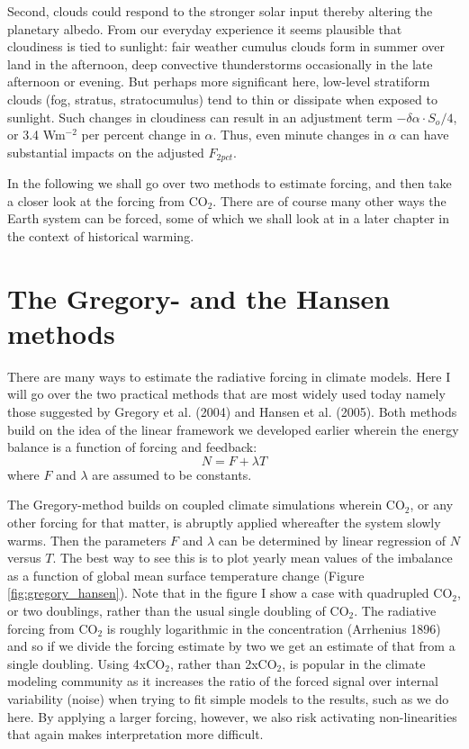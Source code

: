 \documentclass[12pt]{book}
\begin{document}
Second, clouds could respond to the stronger solar input thereby altering the planetary albedo. From our everyday experience it seems plausible that cloudiness is tied to sunlight: fair weather cumulus clouds form in summer over land in the afternoon, deep convective thunderstorms occasionally in the late afternoon or evening. But perhaps more significant here, low-level stratiform clouds (fog, stratus, stratocumulus) tend to thin or dissipate when exposed to sunlight. 
Such  changes in cloudiness can result in an adjustment term $-\delta \alpha \cdot S_o/4$, or 3.4 Wm$^{-2}$ per percent change in $\alpha$. Thus, even minute changes in $\alpha$ can have substantial impacts on the adjusted $F_{2pct}$.

\vspace{0.5 cm}
\noindent
In the following we shall go over two methods to estimate forcing, and then take a closer look at the forcing from CO$_2$. There are of course many other ways the Earth system can be forced, some of which we shall look at in a later chapter in the context of historical warming. 

\section{The Gregory- and the Hansen methods}
\label{sec:gregory-hansen}
There are many ways to estimate the radiative forcing in climate models. Here I will go over the two practical methods that are most widely used today namely those suggested by Gregory et al. (2004) and Hansen et al. (2005). Both methods build on the idea of the linear framework we developed earlier wherein the energy balance is a function of forcing and feedback:
$$N=F+\lambda T$$
where $F$ and $\lambda$ are assumed to be constants. 

The Gregory-method builds on coupled climate simulations wherein CO$_2$, or any other forcing for that matter, is abruptly applied whereafter the system slowly warms. Then the parameters $F$ and $\lambda$ can be determined by linear regression of $N$ versus $T$. The best way to see this is to plot yearly mean values of the imbalance as a function of global mean surface temperature change (Figure \ref{fig:gregory_hansen}). Note that in the figure I show a case with quadrupled CO$_2$, or two doublings, rather than the usual single doubling of CO$_2$. The radiative forcing from CO$_2$ is roughly logarithmic in the concentration (Arrhenius 1896) and so if we divide the forcing estimate by two we get an estimate of that from a single doubling. Using 4xCO$_2$, rather than 2xCO$_2$, is popular in the climate modeling community as it increases the ratio of the forced signal over internal variability (noise) when trying to fit simple models to the results, such as we do here. By applying a larger forcing, however, we also risk activating non-linearities that again makes interpretation more difficult.
\end{document}
